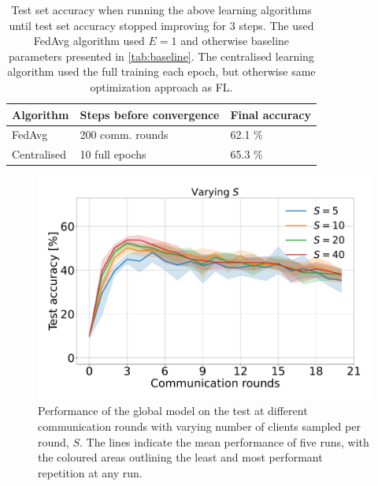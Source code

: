\documentclass{article}
\begin{document}
\begin{table}[htb!]
    \centering
        \begin{tabular}{lll}
            Algorithm & Steps before convergence & Final accuracy\\
            \hline
            FedAvg & 200 comm. rounds & 62.1 \%\\
            Centralised & 10 full epochs & 65.3 \%
        \end{tabular}
    \caption{
        Test set accuracy when running the above learning algorithms until test set accuracy stopped improving for 3 steps.
        The used FedAvg algorithm used $E=1$ and otherwise baseline parameters presented in \ref{tab:baseline}.
        The centralised learning algorithm used the full training each epoch, but otherwise same optimization approach as FL.
    }
    \label{app:centralised}
\end{table}\noindent
\begin{figure}[htb!]
    \centering
    \includegraphics[width=\linewidth]{imgs/S.pdf}
    \caption{Performance of the global model on the test at different communication rounds with varying number of clients sampled per round, $S$.
    The lines indicate the mean performance of five runs, with the coloured areas outlining the least and most performant repetition at any run.}
    \label{fig:s}
\end{figure}\noindent
\end{document}
